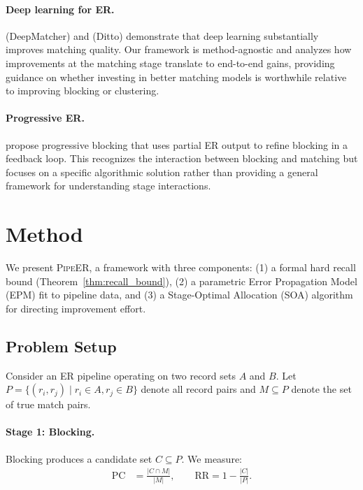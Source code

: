 \documentclass{article}
\newcommand{\PC}{\mathrm{PC}}
\newcommand{\RR}{\mathrm{RR}}
\newcommand{\PipeER}{\textsc{PipeER}}
\begin{document}
\paragraph{Deep learning for ER.}
\citet{mudgal2018deep} (DeepMatcher) and \citet{li2020deep} (Ditto) demonstrate that deep learning substantially improves matching quality.
Our framework is method-agnostic and analyzes how improvements at the matching stage translate to end-to-end gains, providing guidance on whether investing in better matching models is worthwhile relative to improving blocking or clustering.

\paragraph{Progressive ER.}
\citet{galhotra2021efficient} propose progressive blocking that uses partial ER output to refine blocking in a feedback loop.
This recognizes the interaction between blocking and matching but focuses on a specific algorithmic solution rather than providing a general framework for understanding stage interactions.

\section{Method}
\label{sec:method}

We present \PipeER{}, a framework with three components: (1) a formal hard recall bound (Theorem~\ref{thm:recall_bound}), (2) a parametric Error Propagation Model (EPM) fit to pipeline data, and (3) a Stage-Optimal Allocation (SOA) algorithm for directing improvement effort.

\subsection{Problem Setup}

Consider an ER pipeline operating on two record sets $A$ and $B$. Let $P = \{(r_i, r_j) \mid r_i \in A, r_j \in B\}$ denote all record pairs and $M \subseteq P$ denote the set of true match pairs.

\paragraph{Stage 1: Blocking.} Blocking produces a candidate set $C \subseteq P$. We measure:
\begin{align}
    \PC &= \frac{|C \cap M|}{|M|}, \qquad \RR = 1 - \frac{|C|}{|P|}.
\end{align}
\end{document}
